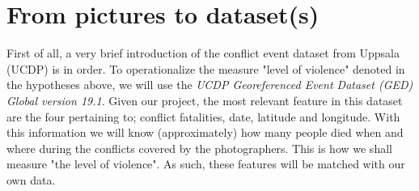\documentclass[a4paper]{article}
\begin{document}
\section{From pictures to dataset(s)}
First of all, a very brief introduction of the conflict event dataset from Uppsala (UCDP) is in order. To operationalize the measure "level of violence" denoted in the hypotheses above, we will use the \textit{UCDP Georeferenced Event Dataset (GED) Global version 19.1}\cite{Sundberg_2013}. Given our project, the most relevant feature in this dataset are the four pertaining to; conflict fatalities, date, latitude and longitude. With this information we will know (approximately) how many people died when and where during the conflicts covered by the photographers. This is how we shall measure "the level of violence". As such, these features will be matched with our own data.\par 


\end{document}
